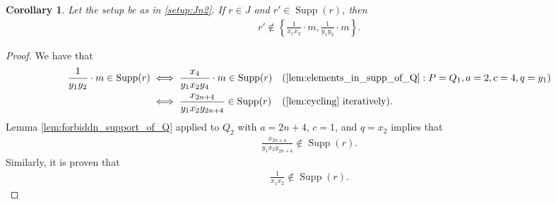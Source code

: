 \documentclass[12pt,a4paper]{amsart}
\theoremstyle{plain}
\newtheorem{cor}[thrm]{Corollary}
\def\bcor{\begin{cor}}
\def\ecor{\end{cor}}
\newtheorem{lem}[thrm]{Lemma}
\def\blem{\begin{lem}}
\def\elem{\end{lem}}
\theoremstyle{definition}
\def\bproof{\begin{proof}}
\def\eproof{\end{proof}}
\theoremstyle{remark}
\DeclareMathOperator{\Supp}{Supp}
\begin{document}

\bcor
\label{cor:Jn2_restrictions_supp_r}
Let the setup be as in \ref{setup:Jn2}. If $r \in J$ and $r' \in \Supp(r)$, then
\begin{align*}
    r' \notin \left \{ \frac{1}{x_{1}x_{2}}\cdot m, \frac{1}{y_{1}y_{2}}\cdot m \right \}.
\end{align*}
\ecor 

\bproof
We have that
\begin{align*}
    \frac{1}{y_{1}y_{2}} \cdot m \in \Supp(r) 
    &\iff \frac{x_{4}}{y_{1}x_{2}y_{4}}\cdot m \in \Supp(r) & &  (\ref{lem:elements_in_supp_of_Q} : P = Q_{1}, a = 2, c = 4, q = y_{1}) \\
    &\iff \frac{x_{2n+4}}{y_{1}x_{2}y_{2n+4}} \in \Supp(r) & & (\ref{lem:cycling} \text{ iteratively}).
\end{align*}
Lemma \ref{lem:forbiddn_support_of_Q} applied to $Q_{2}$ with $a = 2n+4$, $c = 1$, and $q = x_{2}$ implies that 
\begin{align*}
    \frac{x_{2n+4}}{y_{1}x_{2}y_{2n+4}} \notin \Supp(r).
\end{align*}
Similarly, it is proven that 
\begin{align*}
    \frac{1}{x_{1}x_{2}} \notin \Supp(r).
\end{align*}
\eproof
\end{document}
